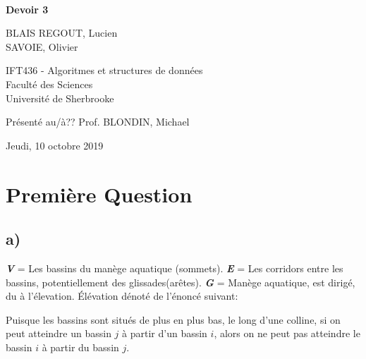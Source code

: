 \documentclass[11pt,a4paper, oneside, oldfontcommands]{memoir}
\begin{document}
\thispagestyle{empty}

{%
\sffamily
\centering
\Large

~\vspace{\fill}

{\huge 
\textbf{Devoir 3}
}

\vspace{2.5cm}

{
BLAIS REGOUT, Lucien\\[1em]
SAVOIE, Olivier
}

\vspace{3.5cm}

IFT436 - Algoritmes et structures de données\\[1em]

Faculté des Sciences\\
Université de Sherbrooke

\vspace{3.5cm}

Présenté au/à?? Prof. BLONDIN, Michael

\vspace{\fill}

Jeudi, 10 octobre 2019

}%
\chapter{Première Question}
\section{a)}
  \textbf{\textit{V}} = Les bassins du manège aquatique (sommets).
  \textbf{\textit{E}} = Les corridors entre les bassins, potentiellement des glissades(arêtes).
  \textbf{\textit{G}} = Manège aquatique, est dirigé, du à l'élevation.
  Élévation dénoté de l'énoncé suivant:
  \begin{siderules}
    Puisque les bassins sont situés de plus en plus bas, le long d'une colline, si on peut atteindre un bassin $j$ à partir d'un bassin $i$, alors on ne peut pas atteindre le bassin $i$ à partir du bassin $j$.
  \end{siderules}
\end{document}
